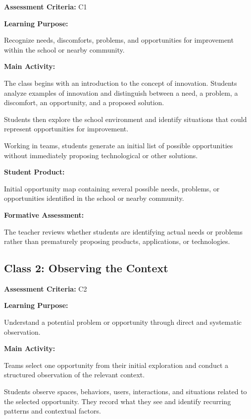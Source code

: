 \documentclass[12pt,a4paper]{article}
\begin{document}
	\textbf{Assessment Criteria:} C1
	
	\textbf{Learning Purpose:}
	
	Recognize needs, discomforts, problems, and opportunities for improvement within the school or nearby community.
	
	\textbf{Main Activity:}
	
	The class begins with an introduction to the concept of innovation. Students analyze examples of innovation and distinguish between a need, a problem, a discomfort, an opportunity, and a proposed solution.
	
	Students then explore the school environment and identify situations that could represent opportunities for improvement.
	
	Working in teams, students generate an initial list of possible opportunities without immediately proposing technological or other solutions.
	
	\textbf{Student Product:}
	
	Initial opportunity map containing several possible needs, problems, or opportunities identified in the school or nearby community.
	
	\textbf{Formative Assessment:}
	
	The teacher reviews whether students are identifying actual needs or problems rather than prematurely proposing products, applications, or technologies.
	
	
	\subsection{Class 2: Observing the Context}
	
	\textbf{Assessment Criteria:} C2
	
	\textbf{Learning Purpose:}
	
	Understand a potential problem or opportunity through direct and systematic observation.
	
	\textbf{Main Activity:}
	
	Teams select one opportunity from their initial exploration and conduct a structured observation of the relevant context.
	
	Students observe spaces, behaviors, users, interactions, and situations related to the selected opportunity. They record what they see and identify recurring patterns and contextual factors.
	
\end{document}
